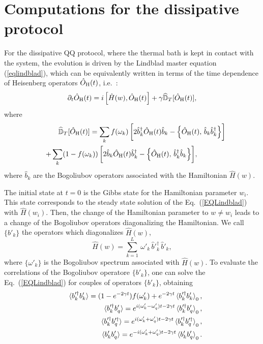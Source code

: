 \section{Computations for the dissipative protocol}
\label{dissprotcomp}

For the dissipative QQ protocol, where the thermal bath is kept in
contact with the system, the evolution is driven by the Lindblad
master equation (\ref{eqlindblad}), which can be equivalently written in
terms of the time dependence of Heisenberg operators $\hat{O}_{\rm H}(t)$,
i.e.~\cite{CPR-2022-otto_engine, dr2021self}:
\begin{eqnarray}
   \label{EQLindblad}
   \partial_t \hat{O}_{\rm H}(t)   = i\,\Bigr[\hat{H}(w),
     \hat{O}_{\rm H}(t) \Bigr] + \gamma
   \widehat{\mathbb{D}}_T[\hat{O}_{\rm H}(t)],
   \label{oheq}
\end{eqnarray}
   where 
\begin{eqnarray}
&& \widehat{\mathbb{D}}_T[\hat{O}_{\rm H}(t)] = \sum _k f(\omega_k)\,\biggr[2\hat
    b_{k}^\dagger \hat{O}_{\rm H}(t) \hat b_{k}- \Bigl\{ \hat{O}_{\rm
      H}(t), \, \hat b_{k} \hat b_{k}^\dagger \Bigl\} \biggr]
  \nonumber \\ && + \sum_k (1-f(\omega_k)) \,\biggr[ 2\hat b_{k}
    \hat{O}_{\rm H}(t) \hat b_{k}^\dagger - \Bigl\{ \hat{O}_{\rm
      H}(t), \, \hat b_{k}^\dagger \hat b_{k} \Bigl\}
    \biggr],\qquad\qquad
\label{dohdef}
\end{eqnarray}
where $\hat b_k$ are the Bogoliubov operators associated with the
Hamiltonian $\hat{H}(w)$.

The initial state at $t=0$ is the Gibbs state for the Hamiltonian
parameter $w_i$. This state corresponds to the steady state solution
of the Eq.~(\ref{EQLindblad}) with $\hat{H}(w_i)$. Then, the change of
the Hamiltonian parameter to $w\neq w_i$ leads to a change of the
Bogoliubov operators diagonalizing the Hamiltonian.  We call
$\{b'_k\}$ the operators which diagonalizes $\hat{H}(w)$,
\begin{equation}
  \label{quenchHdiag}
  \hat{H}(w)=\sum _{k=1}^L\,\omega'_k \,\hat b'^\dagger _k\,
  \hat b'_k,
\end{equation}
where $\{\omega'_k\}$ is the Bogoliubov spectrum associated with
$\hat{H}(w)$.
To evaluate the correlations of the Bogoliubov operatore $\{b'_k\}$,
one can solve the Eq.~(\ref{EQLindblad}) for couples of operators
$\{b'_k\}$, obtaining~\cite{dr2021self}
\begin{eqnarray}
  && \braket{b'^\dagger_k b'_k} = ( 1 - e^{-2 \gamma t})
  f(\omega'_k) +
  e^{-2\gamma t} \braket{b'^\dagger_k b'_k}_0 ,\nonumber \\
 && \braket{b'^\dagger_k b'_q} =
e^{i(\omega'_k - \omega'_q)t-2 \gamma t}
  \braket{b'^\dagger_k b'_q}_0,
  \nonumber\\
&&  \braket{b'^\dagger_k b'^\dagger_q} =
e^{i(\omega'_k + \omega'_q)t-2 \gamma t}
  \braket{b'^\dagger_k b'^\dagger_q}_0,
  \nonumber \\
  &&  \braket{b'_k b'_q} =
  e^{-i(\omega'_k + \omega'_q)t-2 \gamma t}
  \braket{b'_k b'_q}_0.
  \label{EQLindbladprime}
\end{eqnarray}

